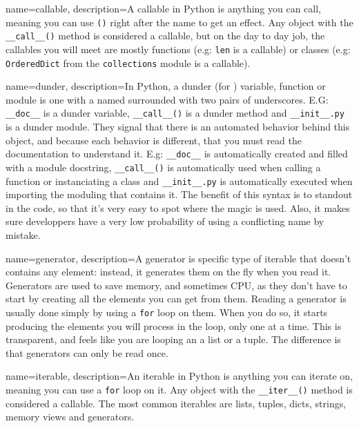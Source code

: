 \makeglossaries

{
    name=callable,
    description={A callable in Python is anything you can call, meaning you can use \lstinline{()} right after the name to get an effect. Any object with the \lstinline{__call__()} method is considered a callable, but on the day to day job, the callables you will meet are mostly functions (e.g: \lstinline{len} is a callable) or classes (e.g: \lstinline{OrderedDict} from the \lstinline{collections} module is a callable).}
}

{
    name=dunder,
    description={In Python, a dunder (for ) variable, function or module is one with a named surrounded with two pairs of underscores. E.G: \lstinline{__doc__} is a dunder variable, \lstinline{__call__()} is a dunder method and \lstinline{__init__.py} is a dunder module. They signal that there is an automated behavior behind this object, and because each behavior is different, that you must read the documentation to understand it. E.g: \lstinline{__doc__} is automatically created and filled with a module docstring, \lstinline{__call__()} is automatically used when calling a function or instanciating a class and \lstinline{__init__.py} is automatically executed when importing the moduling that contains it. The benefit of this syntax is to standout in the code, so that it's very easy to spot where the magic is used. Also, it makes sure developpers have a very low probability of using a conflicting name by mistake.}
}

{
    name=generator,
    description={A generator is specific type of \gls{iterable} that doesn't contains any element: instead, it generates them on the fly when you read it. Generators are used to save memory, and sometimes CPU, as they don't have to start by creating all the elements you can get from them. Reading a generator is usually done simply by using a \lstinline{for} loop on them. When you do so, it starts producing the elements you will process in the loop, only one at a time. This is transparent, and feels like you are looping an a list or a tuple. The difference is that generators can only be read once. }
}


{
    name=iterable,
    description={An iterable in Python is anything you can iterate on, meaning you can use a \lstinline{for} loop on it. Any object with the \lstinline{__iter__()} method is considered a callable. The most common iterables are lists, tuples, dicts, strings, memory views and generators.}
}

